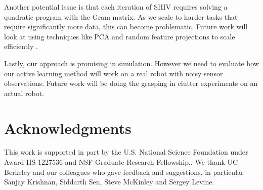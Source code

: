 \documentclass[10pt, conference]{ieeeconf}      %
\begin{document}
Another potential issue is that each iteration of SHIV requires solving a quadratic program with the Gram matrix. As we scale to harder tasks that require significantly more data, this can become problematic. Future work will look at using techniques like PCA and random feature projections to scale efficiently . 

Lastly, our approach is promising in simulation. However we need to evaluate how our active learning method will work on a real robot with noisy sensor observations. Future work will be doing the grasping in clutter experiments on an actual robot. 

\section{Acknowledgments} 
This work is supported in part by the U.S. National Science Foundation under Award IIS-1227536 and NSF-Graduate Research Fellowship.. 
We thank UC Berkeley and our colleagues who gave feedback and suggestions, in particular Sanjay Krishnan, Siddarth Sen, Steve McKinley and Sergey Levine.






\end{document}
